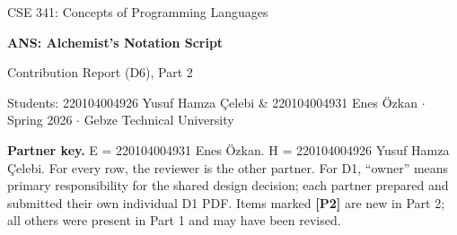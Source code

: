 \documentclass[10pt,a4paper]{article}
\begin{document}
\begin{center}
  {\footnotesize\color{anscaption}CSE 341: Concepts of Programming Languages\par}
  \vspace{2pt}
  {\Large\bfseries\sffamily ANS: Alchemist's Notation Script\par}
  \vspace{2pt}
  {\normalsize Contribution Report (D6), Part 2\par}
  \vspace{4pt}
  {\footnotesize\color{anscaption}
    Students: 220104004926 Yusuf Hamza Çelebi \& 220104004931 Enes Özkan
    \(\cdot\) Spring 2026 \(\cdot\) Gebze Technical University\par}
\end{center}
\vspace{3pt}

\textbf{Partner key.}
E = 220104004931 Enes Özkan.
H = 220104004926 Yusuf Hamza Çelebi.
For every row, the reviewer is the other partner.
For D1, ``owner'' means primary responsibility for the shared design decision; each partner prepared and submitted their own individual D1 PDF.
Items marked \textbf{[P2]} are new in Part 2; all others were present in Part 1 and may have been revised.
\end{document}
